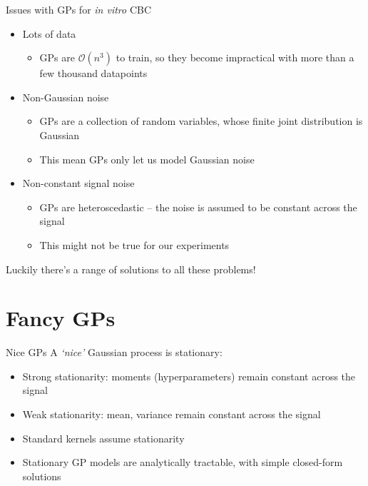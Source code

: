 \documentclass[presentation]{beamer}
\begin{document}
\begin{frame}[label={sec:org25af955}]{Issues with GPs for \emph{in vitro} CBC}
\begin{itemize}
\item Lots of data
\begin{itemize}
\item GPs are \(\mathcal{O}(n^3)\) to train, so they become impractical with more than a few thousand datapoints
\end{itemize}
\item Non-Gaussian noise
\begin{itemize}
\item GPs are a collection of random variables, whose finite joint distribution is Gaussian
\item This mean GPs only let us model Gaussian noise
\end{itemize}
\item Non-constant signal noise
\begin{itemize}
\item GPs are heteroscedastic -- the noise is assumed to be constant across the signal
\item This might not be true for our experiments
\end{itemize}
\end{itemize}

\vfill

Luckily there's a range of solutions to all these problems!
\end{frame}


\section{Fancy GPs}
\label{sec:org732a220}
\begin{frame}[label={sec:org77d5309}]{Nice GPs}
A \emph{`nice'} Gaussian process is stationary:

\vfill

\begin{itemize}
\item Strong stationarity: moments (hyperparameters) remain constant across the signal
\item Weak stationarity: mean, variance remain constant across the signal
\item Standard kernels assume stationarity
\item Stationary GP models are analytically tractable, with simple closed-form solutions
\end{itemize}

\vfill
\end{frame}
\end{document}
